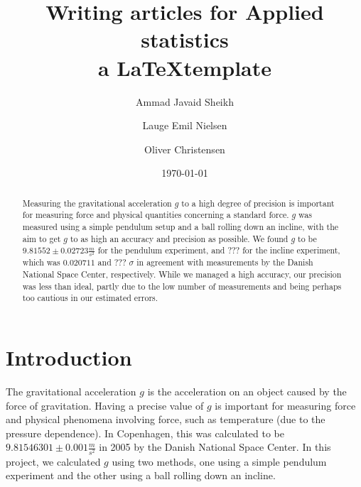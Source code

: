 \documentclass[a4paper,%
               aps,%
               prl,%
               amsfonts,%
               amssymb,%
               amsmath,%
               nobibnotes,%
               twocolumn, %
               twoside,%
               balancelastpage,%
               eqsecnum] %
               {revtex4-1}
\begin{document}

\title{Writing articles for Applied statistics \\ a \LaTeX template} %
\date{\today}                                                %

\author{Ammad Javaid Sheikh}
\author{Lauge Emil Nielsen}
\author{Oliver Christensen}

\begin{abstract}                                              
Measuring the gravitational acceleration $g$ to a high degree of precision is important for measuring force and physical quantities concerning a standard force. $g$ was measured using a simple pendulum setup and a ball rolling down an incline, with the aim to get $g$ to as high an accuracy and precision as possible. We found $g$ to be $9.81552 \pm 0.02723 \frac{m}{s^2}$ for the pendulum experiment, and ??? for the incline experiment, which was $0.020711$ and ??? $\sigma$ in agreement with measurements by the Danish National Space Center, respectively. While we managed a high accuracy, our precision was less than ideal, partly due to the low number of measurements and being perhaps too cautious in our estimated errors.
\end{abstract}

\maketitle 

\setcounter{section}{1} %
\setcounter{equation}{0} %


\section{Introduction}
The gravitational acceleration $g$ is the acceleration on an object caused by the force of gravitation. Having a precise value of $g$ is important for measuring force and physical phenomena involving force, such as temperature (due to the pressure dependence). In Copenhagen, this was calculated to be $9.81546301 \pm 0.001 \frac{m}{s^2}$ in 2005 by the Danish National Space Center.\cite{Gravity2005} In this project, we calculated $g$ using two methods, one using a simple pendulum experiment and the other using a ball rolling down an incline.
\end{document}
